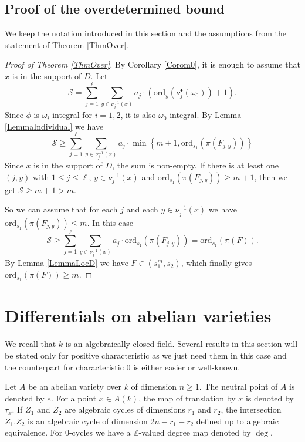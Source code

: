\documentclass[11pt]{amsart}
\theoremstyle{remark}
\numberwithin{equation}{section}
\newcommand{\Scal}{\mathscr{S}}
\newcommand{\Z}{\mathbb{Z}}
\newcommand{\ord}{\mathrm{ord}}
\begin{document}
\subsection{Proof of the overdetermined bound} We keep the notation introduced in this section and the assumptions from the statement of Theorem \ref{ThmOver}.
\begin{proof}[Proof of Theorem \ref{ThmOver}] By Corollary \ref{Corom0}, it is enough to assume that $x$ is in the support of $D$.  Let 
$$
\Scal= \sum_{j=1}^\ell \sum_{y\in \nu_j^{-1}(x)} a_j\cdot \left(\ord_y (\nu_j^\bullet (\omega_0))+1 \right). 
$$
Since $\phi$ is $\omega_i$-integral for $i=1,2$, it is also $\omega_0$-integral. By Lemma \ref{LemmaIndividual} we have
$$
\Scal\ge \sum_{j=1}^\ell \sum_{y\in \nu_j^{-1}(x)} a_j\cdot \min\left\{ m+1 , \ord_{s_1}(\pi(F_{j,y}))\right\}
$$
Since $x$ is in the support of $D$, the sum is non-empty. If there is at least one $(j,y)$ with  $1\le j\le \ell$, $y\in \nu_j^{-1}(x)$ and $\ord_{s_1}(\pi(F_{j,y}))\ge m+1$, then we get $\Scal\ge m+1>m$. 

So we can assume that for each $j$ and each $y\in\nu_j^{-1}(x)$ we have $\ord_{s_1}(\pi(F_{j,y}))\le m$. In this case
$$
\Scal\ge \sum_{j=1}^\ell \sum_{y\in \nu_j^{-1}(x)} a_j\cdot \ord_{s_1}(\pi(F_{j,y})) = \ord_{s_1} (\pi(F)).
$$
By Lemma \ref{LemmaLocD} we have $F\in (s_1^m,s_2)$, which finally gives $\ord_{s_1} (\pi(F))\ge m$.
\end{proof}



\section{Differentials on abelian varieties} \label{SecRestrictions}

We recall that $k$ is an algebraically closed field. Several results in this section will be stated only for positive characteristic as we just need them in this case and the counterpart for characteristic $0$ is either easier or well-known.  

Let $A$ be an abelian variety over $k$ of dimension $n\ge 1$. The neutral point of $A$ is denoted by $e$. For a point $x\in A(k)$, the map of translation by $x$ is denoted by $\tau_x$. If $Z_1$ and $Z_2$ are algebraic cycles of dimensions $r_1$ and $r_2$, the intersection $Z_1.Z_2$ is an algebraic cycle of dimension $2n-r_1-r_2$ defined up to algebraic equivalence. For $0$-cycles we have a $\Z$-valued degree map denoted by $\deg$.
\end{document}
